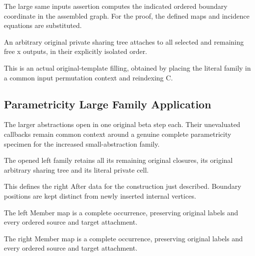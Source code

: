 The large same inputs assertion computes the indicated ordered boundary coordinate in the assembled graph.
For the proof, the defined maps and incidence equations are substituted.
\par{}

An arbitrary original private sharing tree attaches to all selected and remaining free x outputs, in their explicitly isolated order.
\par{}

This is an actual original-template filling, obtained by placing the literal family in a common input permutation context and reindexing C.
\par{}

\subsection{Parametricity Large Family Application}
The larger abstractions open in one original beta step each. Their unevaluated callbacks remain common context around a genuine complete parametricity specimen for the increased small-abstraction family.

The opened left family retains all its remaining original closures, its original arbitrary sharing tree and its literal private cell.
\par{}

This defines the right After data for the construction just described. Boundary positions are kept distinct from newly inserted internal vertices.
\par{}

The left Member map is a complete occurrence, preserving original labels and every ordered source and target attachment.
\par{}

The right Member map is a complete occurrence, preserving original labels and every ordered source and target attachment.
\par{}

